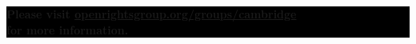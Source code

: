 \documentclass[10.5pt,a5paper]{article} %
\begin{document}
\begin{multicols*}{2}
\begin{center}
	\vfill %
	\colorbox{Black}{
		\begin{minipage}{5cm}
			\color{white}
			\vspace{0.2cm}
			\begin{center}
				\textbf{{\large Please visit \url{openrightsgroup.org/groups/cambridge}\\for more information.}}
			\end{center}
			\vspace{0.2cm}
		\end{minipage}
	}
\end{center}

\vspace{0.75cm}

\end{multicols*}
\end{document}
